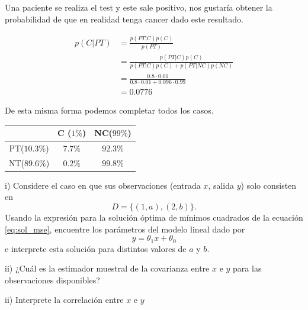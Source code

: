Una paciente se realiza el test y este sale positivo, nos gustaría obtener la probabilidad de que en realidad tenga cancer dado este resultado.

\begin{align}
	p(C|PT) & =\frac{p(PT|C)p(C)}{p(PT)} \\
			& = \frac{p(PT|C)p(C)}{p(PT|C)p(C)+p(PT|NC)p(NC)} \\
			& = \frac{0.8 \cdot 0.01}{0.8 \cdot 0.01 + 0.096 \cdot 0.99}\\
			& = 0.0776
\end{align}

De esta misma forma podemos completar todos los casos.
\\
{
\centering
\begin{tabular}{c|cc}
\toprule
   & C ($1\%$) &  NC($99\%$) \\\hline
PT($10.3\%$) & $7.7\%$ & $92.3\%$\\
NT($89.6$\%) & $0.2\%$ & $99.8\%$ \\
\bottomrule
\end{tabular}
}




i) Considere el caso en que sus observaciones (entrada $x$, salida $y$) solo consisten en 
\begin{equation}
D = \{(1,a),(2,b)\}.
\end{equation}
Usando la expresión para la solución óptima de mínimos cuadrados de la ecuación \eqref{eq:sol_mse}, encuentre los parámetros del modelo lineal dado por 
\begin{equation}
	y = \theta_1 x +\theta_0 
\end{equation}
e interprete esta solución para distintos valores de $a$ y $b$.

ii) ¿Cuál es la estimador muestral de la covarianza entre $x$ e $y$ para las observaciones disponibles? 

ii) Interprete la correlación entre $x$ e $y$ 




